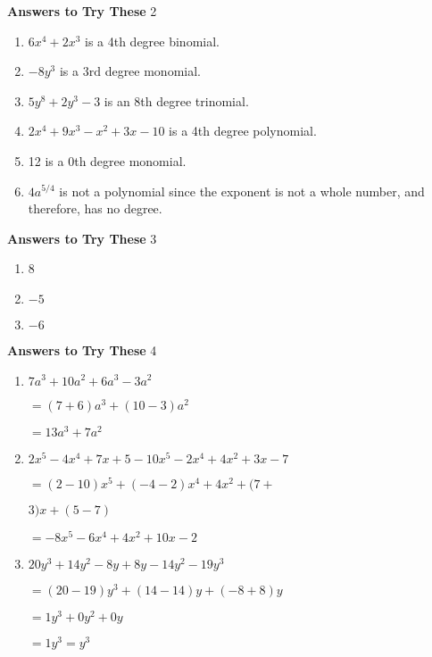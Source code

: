 \documentclass[a4paper]{JAC2003}
\begin{document}
\noindent\textcolor{red!75!black}{\textbf{Answers to Try These}} 2
\begin{enumerate}
\item $6 x^{4}+2 x^{3}$ is a 4th degree binomial.

\item $-8 y^{3}$ is a $3 \mathrm{rd}$ degree monomial.

\item $5 y^{8}+2 y^{3}-3$ is an 8th degree trinomial.

\item $2 x^{4}+9 x^{3}-x^{2}+3 x-10$ is a 4th degree polynomial.

\item 12 is a 0th degree monomial.

\item $4 a^{5 / 4}$ is not a polynomial since the exponent is not a whole number, and therefore, has no degree.
    \end{enumerate}

\noindent\textcolor{red!75!black}{\textbf{Answers to Try These}} 3
\begin{enumerate}
\item 8

\item $-5$ %

\item $-6$
\end{enumerate}

\noindent\textcolor{red!75!black}{\textbf{Answers to Try These}} 4
\begin{enumerate}
\item $7 a^{3}+10 a^{2}+6 a^{3}-3 a^{2}$

$=(7+6) a^{3}+(10-3) a^{2}$

$=13 a^{3}+7 a^{2}$

\item $2 x^{5}-4 x^{4}+7 x+5-10 x^{5}-2 x^{4}+4 x^{2}+3 x-7$

$=(2-10) x^{5}+(-4-2) x^{4}+4 x^{2}+(7+$

$3) x+(5-7)$

$=-8 x^{5}-6 x^{4}+4 x^{2}+10 x-2$

\item $20 y^{3}+14 y^{2}-8 y+8 y-14 y^{2}-19 y^{3}$

$=(20-19) y^{3}+(14-14) y+(-8+8) y$

$=1 y^{3}+0 y^{2}+0 y$

$=1 y^{3}=y^{3}$
\end{enumerate}
\end{document}
